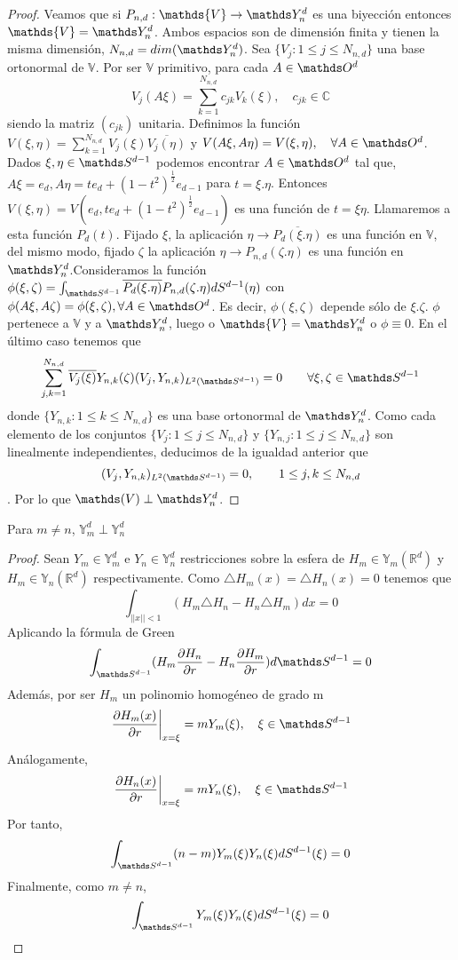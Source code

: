 \begin{proof}
Veamos que si $P_{n,d}:\mathds{V} \to \spharm$ es una biyección entonces $\mathds{V}=\spharm$. Ambos espacios son de dimensión finita y tienen la misma dimensión, $N_{n,d}=dim(\spharm)$. Sea $\{V_j : 1 \le j \le N_{n,d} \}$ una base ortonormal de  $\mathds{V}$. Por ser $\mathds{V}$ primitivo, para cada $A\in\orto$ $$
V_j(A\xi) = \sum_{k=1}^{N_{n,d}}c_{jk}V_k(\xi), \quad c_{jk}\in\mathds{C}$$ siendo la matriz $(c_{jk})$ unitaria. Definimos la función $V(\xi,\eta) = \sum_{k=1}^{N_{n,d}}V_j(\xi)\overline{V_j(\eta)}$
y $V(A\xi,A\eta) = V(\xi,\eta), \quad \forall A \in \orto$.
Dados $\xi,\eta \in \sphere$ podemos encontrar $A\in\orto$ tal que, $A\xi=e_d, A\eta = te_d + (1-t^2)^{\frac{1}{2}}e_{d-1}$ para $t=\xi.\eta$. Entonces $V(\xi,\eta) = V(e_d, te_d + (1-t^2)^{\frac{1}{2}}e_{d-1})$ es una función de $t=\xi\eta$. Llamaremos a esta función $P_d(t)$. Fijado $\xi$, la aplicación $\eta \to \overline{P_d(\xi.\eta)}$ es una función en $\mathds{V}$, del mismo modo, fijado $\zeta$ la aplicación $\eta \to P_{n,d}(\zeta.\eta)$ es una función en $\spharm$.Consideramos la función $\phi(\xi,\zeta) = \sphint \overline{P_d(\xi.\eta)}P_{n,d}(\zeta.\eta)dS^{d-1}(\eta)$ con $\phi(A\xi,A\zeta)= \phi(\xi,\zeta), \forall A\in\orto$. Es decir, $\phi(\xi,\zeta)$ depende sólo de $\xi.\zeta$. $\phi$ pertenece a $\mathds{V}$ y a $\spharm$, luego o $\mathds{V} = \spharm$ o $\phi \equiv 0$. En el último caso tenemos que $$
\sum_{j,k=1}^{N_{n,d}} \overline{V_j(\xi)}Y_{n,k}(\zeta)(V_j,Y_{n,k})_{L^2(\sphere)}=0 \qquad \forall\xi,\zeta \in \sphere
$$ donde $\{Y_{n,k}:1\le k\le N_{n,d}\}$ es una base ortonormal de $\spharm$. Como cada elemento de los conjuntos $\{V_j : 1\le j\le N_{n,d}\}$ y $\{Y_{n,j}:1\le j\le N_{n,d}\}$ son linealmente independientes, deducimos de la igualdad anterior que $$
(V_j,Y_{n,k})_{L^2(\sphere)} = 0, \qquad 1 \le j,k \le N_{n,d} $$. Por lo que $\mathds(V) \perp \spharm$.
\end{proof}
\begin{cor}Para $m\neq n$, $\mathds{Y}_m^d \perp \mathds{Y}_n^d$
\end{cor}
\begin{proof}Sean $Y_m \in \mathds{Y}_m^d$ e  $Y_n \in \mathds{Y}_n^d$ restricciones sobre la esfera de  $H_m \in \mathds{Y}_m(\mathds{R}^d)$ y $H_m \in \mathds{Y}_n(\mathds{R}^d)$ respectivamente. Como $\triangle H_m(x) = \triangle H_n(x) = 0$ tenemos que $$
	\int_{||x||< 1}(H_m\triangle H_n-H_n\triangle H_m)dx = 0
	$$
Aplicando la fórmula de Green$$
\int_{\sphere}(H_m \frac{\partial H_n}{\partial r} - H_n \frac{\partial H_m}{\partial r}) d\sphere = 0$$
Además, por ser $H_m$ un polinomio homogéneo de grado m $$
\left.\frac{\partial H_m(x)}{\partial r}\right|_{x=\xi} = m Y_m(\xi),\quad \xi\in\sphere$$
Análogamente,
$$
\left.\frac{\partial H_n(x)}{\partial r}\right|_{x=\xi} = m Y_n(\xi),\quad \xi\in\sphere 
$$
Por tanto, $$
\sphint (n-m)Y_m(\xi)Y_n(\xi)dS^{d-1}(\xi) = 0
$$
Finalmente, como $m\neq n$, $$
\sphint Y_m(\xi)Y_n(\xi)dS^{d-1}(\xi) = 0
$$
\end{proof}
